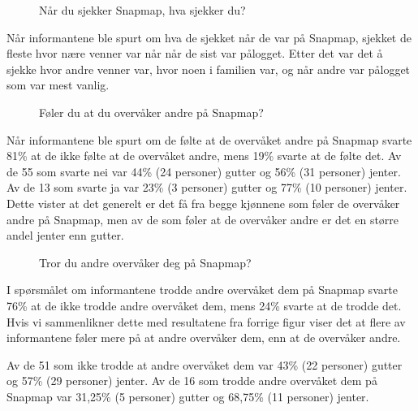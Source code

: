 \begin{figure}[H]
    \centering
    \begin{bchart}[max=28, step=4]
        \smallskip
        \smallskip
        \smallskip
        \smallskip
        \smallskip
        \smallskip
    \end{bchart}
    \caption{Når du sjekker Snapmap, hva sjekker du?}
\end{figure}
Når informantene ble spurt om hva de sjekket når de var på Snapmap, sjekket de fleste hvor nære venner var når når de sist var pålogget. Etter det var det å sjekke hvor andre venner var, hvor noen i familien var, og når andre var pålogget som var mest vanlig. 

\begin{figure}[H]
    \centering
    \caption{Føler du at du overvåker andre på Snapmap?}
\end{figure}
Når informantene ble spurt om de følte at de overvåket andre på Snapmap svarte 81\% at de ikke følte at de overvåket andre, mens 19\% svarte at de følte det. Av de 55 som svarte nei var 44\% (24 personer) gutter og 56\% (31 personer) jenter. Av de 13 som svarte ja var 23\% (3 personer) gutter og 77\% (10 personer) jenter. Dette vister at det generelt er det få fra begge kjønnene som føler de overvåker andre på Snapmap, men av de som føler at de overvåker andre er det en større andel jenter enn gutter.

\begin{figure}[H]
    \centering
    \caption{Tror du andre overvåker deg på Snapmap?}
\end{figure}
I spørsmålet om informantene trodde andre overvåket dem på Snapmap svarte 76\% at de ikke trodde andre overvåket dem, mens 24\% svarte at de trodde det. Hvis vi sammenlikner dette med resultatene fra forrige figur viser det at flere av informantene føler mere på at andre overvåker dem, enn at de overvåker andre.

Av de 51 som ikke trodde at andre overvåket dem var 43\% (22 personer) gutter og 57\% (29 personer) jenter. Av de 16 som trodde andre overvåket dem på Snapmap var 31,25\% (5 personer) gutter og 68,75\% (11 personer) jenter.

\newpage